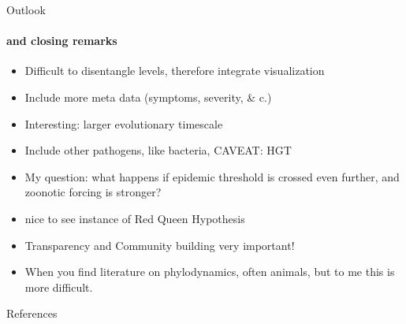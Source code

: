 \documentclass{beamer}
\begin{document}
\begin{darkframes}
    \begin{frame}{Outlook}
      \framesubtitle{and closing remarks}
      \begin{itemize}
        \item Difficult to disentangle levels, therefore integrate visualization
        \item Include more meta data (symptoms, severity, \& c.)
        \item Interesting: larger evolutionary timescale
        \item Include other pathogens, like bacteria, CAVEAT: HGT
        \item My question: what happens if epidemic threshold is crossed even further, and zoonotic forcing is stronger?
        \item nice to see instance of Red Queen Hypothesis
        \item Transparency and Community building very important!
        \item When you find literature on phylodynamics, often animals, but to me this is more difficult.
      \end{itemize}
    \end{frame}

    \begin{frame}[allowframebreaks]{References}
    \tiny


    \end{frame}




  \end{darkframes}
\end{document}
